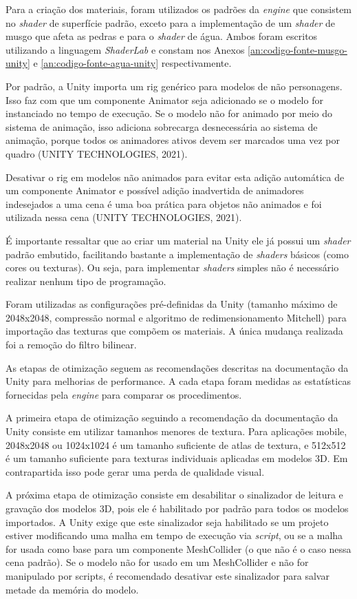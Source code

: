 Para a criação dos materiais, foram utilizados os padrões da \textit{engine} que consistem no \textit{shader} de superfície padrão, exceto para a implementação de um \textit{shader} de musgo que afeta as pedras e para o \textit{shader} de água. Ambos foram escritos utilizando a linguagem \textit{ShaderLab} e constam nos Anexos \ref{an:codigo-fonte-musgo-unity} e \ref{an:codigo-fonte-agua-unity} respectivamente.

Por padrão, a Unity importa um rig genérico para modelos de não personagens. Isso faz com que um componente Animator seja adicionado se o modelo for instanciado no tempo de execução. Se o modelo não for animado por meio do sistema de animação, isso adiciona sobrecarga desnecessária ao sistema de animação, porque todos os animadores ativos devem ser marcados uma vez por quadro (UNITY TECHNOLOGIES, 2021)\nocite{unityTech2021}.

Desativar o rig em modelos não animados para evitar esta adição automática de um componente Animator e possível adição inadvertida de animadores indesejados a uma cena é uma boa prática para objetos não animados e foi utilizada nessa cena (UNITY TECHNOLOGIES, 2021). 

É importante ressaltar que ao criar um material na Unity ele já possui um \textit{shader} padrão embutido, facilitando bastante a implementação de \textit{shaders} básicos (como cores ou texturas). Ou seja, para implementar \textit{shaders} simples não é necessário realizar nenhum tipo de programação.

Foram utilizadas as configurações pré-definidas da Unity (tamanho máximo de 2048x2048, compressão normal e algoritmo de redimensionamento Mitchell) para importação das texturas que compõem os materiais. A única mudança realizada foi a remoção do filtro bilinear.

As etapas de otimização seguem as recomendações descritas na documentação da Unity para melhorias de performance. A cada etapa foram medidas as estatísticas fornecidas pela \textit{engine} para comparar os procedimentos.

A primeira etapa de otimização seguindo a recomendação da documentação da Unity consiste em utilizar tamanhos menores de textura. Para aplicações mobile, 2048x2048 ou 1024x1024 é um tamanho suficiente de atlas de textura, e 512x512 é um tamanho suficiente para texturas individuais aplicadas em modelos 3D. Em contrapartida isso pode gerar uma perda de qualidade visual.

A próxima etapa de otimização consiste em desabilitar o sinalizador de leitura e gravação dos modelos 3D, pois ele é habilitado por padrão para todos os modelos importados. A Unity exige que este sinalizador seja habilitado se um projeto estiver modificando uma malha em tempo de execução via \textit{script}, ou se a malha for usada como base para um componente MeshCollider (o que não é o caso nessa cena padrão). Se o modelo não for usado em um MeshCollider e não for manipulado por scripts, é recomendado desativar este sinalizador para salvar metade da memória do modelo.

